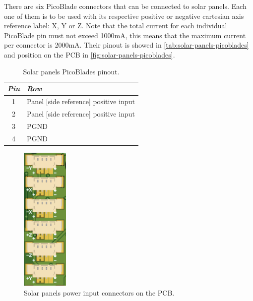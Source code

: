 There are six PicoBlade connectors that can be connected to solar panels. Each one of them is to be used with its respective positive or negative cartesian axis reference label: X, Y or Z. Note that the total current for each individual PicoBlade pin must not exceed 1000mA, this means that the maximum current per connector is 2000mA.
Their pinout is showed in \autoref{tab:solar-panels-picoblades} and position on the PCB in \autoref{fig:solar-panels-picoblades}.

\begin{table}[!h]
    \centering
    \begin{tabular}{cl}
        \toprule[1.5pt]
        \textit{Pin} & \textit{Row} \\
        \midrule
        1            & Panel [side reference] positive input\\
        2            & Panel [side reference] positive input \\
        3            & PGND \\
        4            & PGND \\
        \bottomrule[1.5pt]
    \end{tabular}
    \caption{Solar panels PicoBlades pinout.}
    \label{tab:solar-panels-picoblades}
\end{table}

\begin{figure}[!ht]
    \begin{center}
        \includegraphics[width=0.2\textwidth]{figures/solar-panels-picoblades-3d.png}
        \caption{Solar panels power input connectors on the PCB.}
        \label{fig:solar-panels-picoblades}
    \end{center}
\end{figure}

